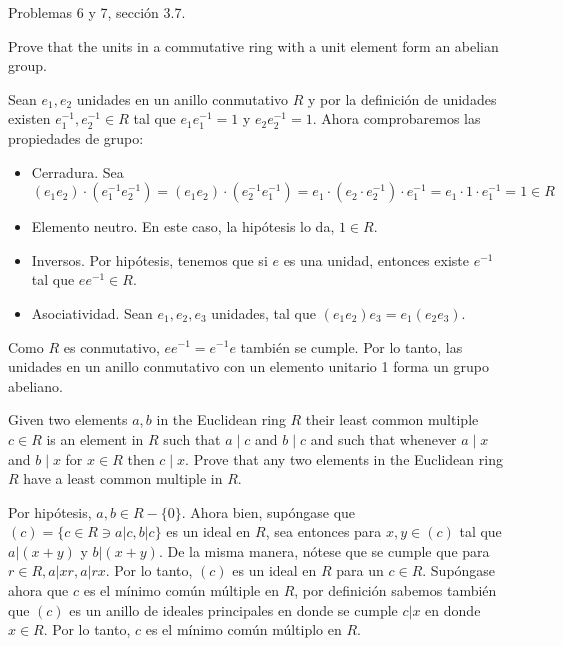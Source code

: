 




Problemas 6 y 7, sección 3.7.

\begin{problema}[Problema 6]
    Prove that the units in a commutative ring with a unit element form an abelian group.
    \begin{dem}
        Sean $e_1,e_2$ unidades en un anillo conmutativo $R$ y por la definición de unidades existen $e_1^{-1},e_2^{-1}\in R$ tal que $e_1e_1^{-1}=1$ y $e_2e_2^{-1}=1$. Ahora comprobaremos las propiedades de grupo: 
        \begin{itemize}
            \item Cerradura. Sea 
            $$(e_1 e_2)\cdot (e_1^{-1}e_2^{-1})=(e_1 e_2)\cdot (e_2^{-1}e_1^{-1})=e_1\cdot(e_2\cdot e_2^{-1})\cdot e_1^{-1}= e_1\cdot 1\cdot e_1^{-1}=1\in R$$
            \item Elemento neutro. En este caso, la hipótesis lo da, $1\in R$.
            \item Inversos. Por hipótesis, tenemos que si $e$ es una unidad, entonces existe $e^{-1}$ tal que $ee^{-1}\in R$.
            \item Asociatividad. Sean $e_1,e_2,e_3$ unidades, tal que $(e_1e_2)e_3= e_1(e_2e_3)$.
        \end{itemize}
        Como $R$ es conmutativo, $ee^{-1}=e^{-1}e$ también se cumple. Por lo tanto, las unidades en un anillo conmutativo con un elemento unitario 1 forma un grupo abeliano. 
    \end{dem}
\end{problema}

\begin{problema}[Problema 7]
    Given two elements $a, b$ in the Euclidean ring $R$ their least common multiple $c \in R$ is an element in $R$ such that $a \mid c$ and $b \mid c$ and such that whenever $a \mid x$ and $b \mid x$ for $x \in R$ then $c \mid x$. Prove that any two elements in the Euclidean ring $R$ have a least common multiple in $R$.
    \begin{dem}
        Por hipótesis, $a,b\in R-\{0\}$. Ahora bien, supóngase que $(c)=\{c\in R\ni a|c,b|c\}$ es un ideal en $R$, sea entonces para $x,y\in (c)$ tal que $a|(x+y)$ y $b|(x+y)$. De la misma manera, nótese que se cumple que para $r\in R, a|xr, a|rx$. Por lo tanto, $(c)$ es un ideal en $R$ para un $c\in R$.  Supóngase ahora que $c$ es el mínimo común múltiple en $R$, por definición sabemos también que $(c)$ es un anillo de ideales principales en donde se cumple $c|x$ en donde $x\in R$. Por lo tanto, $c$ es el mínimo común múltiplo en $R$.
    \end{dem}
\end{problema}

%
%

